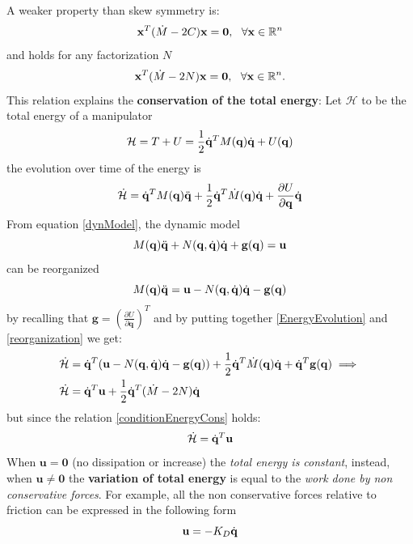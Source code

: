 \documentclass[10pt, a4paper]{report}
\newcommand{\q}{{\mathbf q}}
\begin{document}
\noindent
A weaker property than skew symmetry is:\begin{equation}
    \mathbf x^T(\dot M-2C)\mathbf x=\mathbf 0, \ \ \forall \mathbf x\in \R^n
\end{equation}
and holds for any factorization $N$
\begin{equation}\label{conditionEnergyCons}
    \mathbf x^T(\dot M-2N)\mathbf x=\mathbf 0, \ \ \forall \mathbf x\in {\mathbb R}^n.
\end{equation}
This relation explains the \textbf{conservation of the total energy}: Let $\mathcal H$ to be the total energy of a manipulator\begin{equation}
    \mathcal H=T+U=\frac{1}{2}\dq^T M(\q)\dq+U(\q) 
\end{equation}
the evolution over time of the energy is\begin{equation}\label{EnergyEvolution}
    \dot{\mathcal H}=\dq^TM(\q)\ddq+\frac{1}{2}\dq^T\dot M(\q)\dq+\frac{\partial U}{\partial \q}\dq
\end{equation}
From equation \eqref{dynModel}, the dynamic model\begin{equation}\label{dynModel}
    M(\q)\ddq+N(\q,\dq)\dq+\mathbf g(\q)=\mathbf u
\end{equation}
can be reorganized\begin{equation}\label{reorganization}
     M(\q)\ddq=\mathbf u-N(\q,\dq)\dq-\mathbf g(\q)
\end{equation}
by recalling that $\mathbf g=\left(\frac{\partial U}{\partial \q}\right)^T$ and by putting together \eqref{EnergyEvolution} and \eqref{reorganization} we get:\begin{align}
    &\dot{\mathcal H}=
    \dq^T(\mathbf u-N(\q,\dq)\dq-\mathbf g(\q))+\frac{1}{2}\dq^T\dot M(\q)\dq+\dq^T\mathbf g(\q)\implies \\
   & \dot{\mathcal H}=\dq^T\mathbf u+\frac{1}{2}\dq^T(\dot M-2N)\dq
\end{align}
but since the relation \eqref{conditionEnergyCons} holds:\begin{equation}
    \dot{\mathcal H}={\dot{\mathbf q}}^T\mathbf u
\end{equation}
When $\mathbf u=\mathbf 0$ (no dissipation or increase) the \textit{total energy is constant}, instead, when $\mathbf u\ne \mathbf 0$ the \textbf{variation of total energy} is equal to the \textit{work done by non conservative forces}. For example, all the non conservative forces  relative to  friction can be expressed in the following form\begin{equation}
    \mathbf u = -K_D{\dot{\mathbf q}} 
\end{equation}
\end{document}
